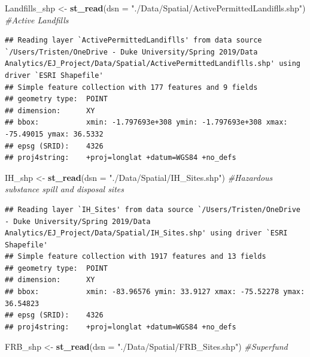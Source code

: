 \documentclass[12pt,]{article}
\newenvironment{Shaded}{\begin{snugshade}}{\end{snugshade}}
\newcommand{\KeywordTok}[1]{\textcolor[rgb]{0.13,0.29,0.53}{\textbf{#1}}}
\newcommand{\DataTypeTok}[1]{\textcolor[rgb]{0.13,0.29,0.53}{#1}}
\newcommand{\StringTok}[1]{\textcolor[rgb]{0.31,0.60,0.02}{#1}}
\newcommand{\CommentTok}[1]{\textcolor[rgb]{0.56,0.35,0.01}{\textit{#1}}}
\newcommand{\NormalTok}[1]{#1}
\begin{document}
\begin{Shaded}
\begin{Highlighting}[]
\NormalTok{Landfills_shp <-}\StringTok{ }\KeywordTok{st_read}\NormalTok{(}\DataTypeTok{dsn =} \StringTok{"./Data/Spatial/ActivePermittedLandiflls.shp"}\NormalTok{) }\CommentTok{#Active Landfills}
\end{Highlighting}
\end{Shaded}

\begin{verbatim}
## Reading layer `ActivePermittedLandiflls' from data source `/Users/Tristen/OneDrive - Duke University/Spring 2019/Data Analytics/EJ_Project/Data/Spatial/ActivePermittedLandiflls.shp' using driver `ESRI Shapefile'
## Simple feature collection with 177 features and 9 fields
## geometry type:  POINT
## dimension:      XY
## bbox:           xmin: -1.797693e+308 ymin: -1.797693e+308 xmax: -75.49015 ymax: 36.5332
## epsg (SRID):    4326
## proj4string:    +proj=longlat +datum=WGS84 +no_defs
\end{verbatim}

\begin{Shaded}
\begin{Highlighting}[]
\NormalTok{IH_shp <-}\StringTok{ }\KeywordTok{st_read}\NormalTok{(}\DataTypeTok{dsn =} \StringTok{"./Data/Spatial/IH_Sites.shp"}\NormalTok{) }\CommentTok{#Hazardous substance spill and disposal sites }
\end{Highlighting}
\end{Shaded}

\begin{verbatim}
## Reading layer `IH_Sites' from data source `/Users/Tristen/OneDrive - Duke University/Spring 2019/Data Analytics/EJ_Project/Data/Spatial/IH_Sites.shp' using driver `ESRI Shapefile'
## Simple feature collection with 1917 features and 13 fields
## geometry type:  POINT
## dimension:      XY
## bbox:           xmin: -83.96576 ymin: 33.9127 xmax: -75.52278 ymax: 36.54823
## epsg (SRID):    4326
## proj4string:    +proj=longlat +datum=WGS84 +no_defs
\end{verbatim}

\begin{Shaded}
\begin{Highlighting}[]
\NormalTok{FRB_shp <-}\StringTok{ }\KeywordTok{st_read}\NormalTok{(}\DataTypeTok{dsn =} \StringTok{"./Data/Spatial/FRB_Sites.shp"}\NormalTok{) }\CommentTok{#Superfund}
\end{Highlighting}
\end{Shaded}
\end{document}
